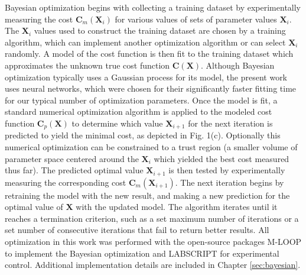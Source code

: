 \documentclass{article}
\begin{document}
Bayesian optimization begins with collecting a training dataset by experimentally measuring the cost $\mathbf{C}_m(\mathbf{X}_i)$ for various values of sets of parameter values $\mathbf{X}_i$. The $\mathbf{X}_i$ values used to construct the training dataset are chosen by a training algorithm, which can implement another optimization algorithm or can select $\mathbf{X}_i$ randomly. A model of the cost function is then fit to the training dataset which approximates the unknown true cost function $\mathbf{C}(\mathbf{X})$. Although Bayesian optimization typically uses a Gaussian process for its model, the present work uses neural networks, which were chosen for their significantly faster fitting time for our typical number of optimization parameters. Once the model is fit, a standard numerical optimization algorithm is applied to the modeled cost function $\mathbf{C}_p(\mathbf{X})$ to determine which value $\mathbf{X}_{i+1}$ for the next iteration is predicted to yield the minimal cost, as depicted in Fig. 1(c). Optionally this numerical optimization can be constrained to a trust region (a smaller volume of parameter space centered around the $\mathbf{X}_i$ which yielded the best cost measured thus far). The predicted optimal value $\mathbf{X}_{i+1}$ is then tested by experimentally measuring the corresponding cost $\mathbf{C}_m(\mathbf{X}_{i+1})$. The next iteration begins by retraining the model with the new result, and making a new prediction for the optimal value of $\mathbf{X}$ with the updated model. The algorithm iterates until it reaches a termination criterion, such as a set maximum number of iterations or a set number of consecutive iterations that fail to return better results. All optimization in this work was performed with the open-source packages M-LOOP to implement the Bayesian optimization and LABSCRIPT for experimental control. Additional implementation details are included in Chapter \ref{sec:bayesian}.
\end{document}

